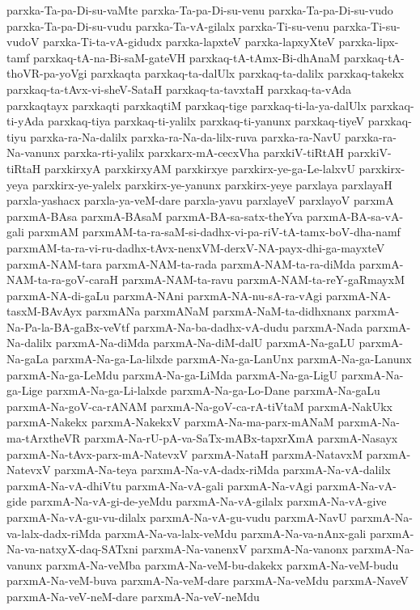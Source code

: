 {parxka-Ta-pa-Di-su-vaMte
parxka-Ta-pa-Di-su-venu
parxka-Ta-pa-Di-su-vudo
parxka-Ta-pa-Di-su-vudu
parxka-Ta-vA-gilalx
parxka-Ti-su-venu
parxka-Ti-su-vudoV
parxka-Ti-ta-vA-gidudx
parxka-lapxteV
parxka-lapxyXteV
parxka-lipx-tamf
parxkaq-tA-na-Bi-saM-gateVH
parxkaq-tA-tAmx-Bi-dhAnaM
parxkaq-tA-thoVR-pa-yoVgi
parxkaqta
parxkaq-ta-dalUlx
parxkaq-ta-dalilx
parxkaq-takekx
parxkaq-ta-tAvx-vi-sheV-SataH
parxkaq-ta-tavxtaH
parxkaq-ta-vAda
parxkaqtayx
parxkaqti
parxkaqtiM
parxkaq-tige
parxkaq-ti-la-ya-dalUlx
parxkaq-ti-yAda
parxkaq-tiya
parxkaq-ti-yalilx
parxkaq-ti-yanunx
parxkaq-tiyeV
parxkaq-tiyu
parxka-ra-Na-dalilx
parxka-ra-Na-da-lilx-ruva
parxka-ra-NavU
parxka-ra-Na-vanunx
parxka-rti-yalilx
parxkarx-mA-cecxVha
parxkiV-tiRtAH
parxkiV-tiRtaH
parxkirxyA
parxkirxyAM
parxkirxye
parxkirx-ye-ga-Le-lalxvU
parxkirx-yeya
parxkirx-ye-yalelx
parxkirx-ye-yanunx
parxkirx-yeye
parxlaya
parxlayaH
parxla-yashacx
parxla-ya-veM-dare
parxla-yavu
parxlayeV
parxlayoV
parxmA
parxmA-BAsa
parxmA-BAsaM
parxmA-BA-sa-satx-theYva
parxmA-BA-sa-vA-gali
parxmAM
parxmAM-ta-ra-saM-si-dadhx-vi-pa-riV-tA-tamx-boV-dha-namf
parxmAM-ta-ra-vi-ru-dadhx-tAvx-nenxVM-derxV-NA-payx-dhi-ga-mayxteV
parxmA-NAM-tara
parxmA-NAM-ta-rada
parxmA-NAM-ta-ra-diMda
parxmA-NAM-ta-ra-goV-caraH
parxmA-NAM-ta-ravu
parxmA-NAM-ta-reY-gaRmayxM
parxmA-NA-di-gaLu
parxmA-NAni
parxmA-NA-nu-sA-ra-vAgi
parxmA-NA-tasxM-BAvAyx
parxmANa
parxmANaM
parxmA-NaM-ta-didhxnanx
parxmA-Na-Pa-la-BA-gaBx-veVtf
parxmA-Na-ba-dadhx-vA-dudu
parxmA-Nada
parxmA-Na-dalilx
parxmA-Na-diMda
parxmA-Na-diM-dalU
parxmA-Na-gaLU
parxmA-Na-gaLa
parxmA-Na-ga-La-lilxde
parxmA-Na-ga-LanUnx
parxmA-Na-ga-Lanunx
parxmA-Na-ga-LeMdu
parxmA-Na-ga-LiMda
parxmA-Na-ga-LigU
parxmA-Na-ga-Lige
parxmA-Na-ga-Li-lalxde
parxmA-Na-ga-Lo-Dane
parxmA-Na-gaLu
parxmA-Na-goV-ca-rANAM
parxmA-Na-goV-ca-rA-tiVtaM
parxmA-NakUkx
parxmA-Nakekx
parxmA-NakekxV
parxmA-Na-ma-parx-mANaM
parxmA-Na-ma-tArxtheVR
parxmA-Na-rU-pA-va-SaTx-mABx-tapxrXmA
parxmA-Nasayx
parxmA-Na-tAvx-parx-mA-NatevxV
parxmA-NataH
parxmA-NatavxM
parxmA-NatevxV
parxmA-Na-teya
parxmA-Na-vA-dadx-riMda
parxmA-Na-vA-dalilx
parxmA-Na-vA-dhiVtu
parxmA-Na-vA-gali
parxmA-Na-vAgi
parxmA-Na-vA-gide
parxmA-Na-vA-gi-de-yeMdu
parxmA-Na-vA-gilalx
parxmA-Na-vA-give
parxmA-Na-vA-gu-vu-dilalx
parxmA-Na-vA-gu-vudu
parxmA-NavU
parxmA-Na-va-lalx-dadx-riMda
parxmA-Na-va-lalx-veMdu
parxmA-Na-va-nAnx-gali
parxmA-Na-va-natxyX-daq-SATxni
parxmA-Na-vanenxV
parxmA-Na-vanonx
parxmA-Na-vanunx
parxmA-Na-veMba
parxmA-Na-veM-bu-dakekx
parxmA-Na-veM-budu
parxmA-Na-veM-buva
parxmA-Na-veM-dare
parxmA-Na-veMdu
parxmA-NaveV
parxmA-Na-veV-neM-dare
parxmA-Na-veV-neMdu
}
